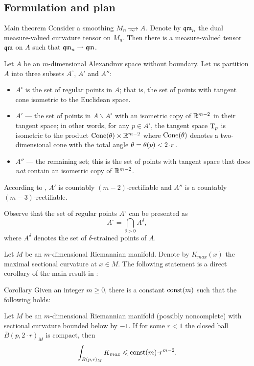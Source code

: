 \subsection{Formulation and plan}
  
\begin{thm}{Main theorem}\label{main}
Consider a smoothing $M_n\smooths{} A$.
Denote by $\operatorname{\mathfrak{qm}}_n$ the dual measure-valued curvature tensor on $M_n$.
Then there is a measure-valued tensor $\operatorname{\mathfrak{qm}}$ on $A$ such that $\operatorname{\mathfrak{qm}}_n\rightharpoonup \operatorname{\mathfrak{qm}}$.
\end{thm}

Let $A$ be an $m$-dimensional Alexandrov space without boundary. 
Let us partition $A$ into three subsets $A^\circ$, $A'$ and $A''$:
\begin{itemize}
\item $A^\circ$ is the set of regular points in $A$; that is, the set of points with tangent cone isometric to the Euclidean space.
\item $A'$ --- the set of points in $A\backslash A^\circ$ with an isometric copy of $\mathbb{R}^{m-2}$ in their tangent space;
in other words, for any $p\in A'$, the tangent space $\mathrm{T}_p$ is isometric to the product $\Cone(\theta)\zz\times\RR^{m-2}$ where $\operatorname{Cone}(\theta)$ denotes a two-dimensional cone with the total angle $\theta\zz=\theta(p)<2\cdot \pi$.
\item $A''$ --- the remaining set; this is the set of points with tangent space that does \emph{not} contain an isometric copy of $\mathbb{R}^{m-2}$.
\end{itemize}
According to \cite{li-naber}, $A'$ is countably $(m-2)$-rectifiable and $A''$ is a countably $(m-3)$-rectifiable. 

Observe that the set of regular points $A^\circ$ can be presented as
$$A^{\circ}=\bigcap_{\delta>0} A^\delta,$$
where $A^\delta$ denotes the set of $\delta$-strained points of $A$.

Let $M$ be an $m$-dimensional Riemannian manifold.
Denote by $K_{max}(x)$ the maximal sectional curvature at $x\in M$.
The following statement is a direct corollary of the main result in \cite{petrunin-SC}:

\begin{thm}{Corollary}\label{cor:Kmax}
Given an integer $m\ge 0$, there is a constant $\mathrm{const}(m)$ such that the following holds:

Let $M$ be an $m$-dimensional Riemannian manifold 
(possibly noncomplete)
with sectional curvature bounded below by $-1$.
If for some $r<1$ the closed ball $\bar B(p,2\cdot r)_M$ is compact,
then 
$$\int_{B(p,r)_M} K_{max}\le \const(m)\cdot r^{m-2}.$$

\end{thm}

